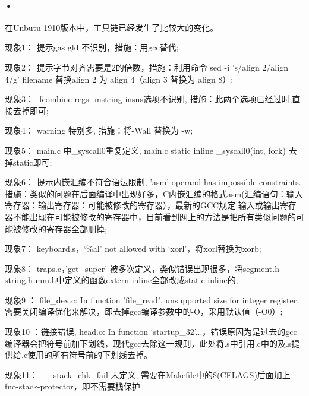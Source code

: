 \documentclass[12pt]{article}
\begin{document}
\paragraph{•}
在Unbutu 1910版本中，工具链已经发生了比较大的变化。
\begin{list}{•}{•}
\item 现象1： 提示gas gld 不识别，措施：用gcc替代;
\item 现象2： 提示字节对齐需要是2的倍数，措施：利用命令
sed -i 's/align 2/align 4/g' filename
替换align 2 为 align 4（align 3 替换为 align 8）;
\item 现象3： -fcombine-regs -mstring-insns选项不识别, 措施：此两个选项已经过时,直接去掉即可;
\item 现象4： warning 特别多, 措施：将-Wall 替换为 -w;
\item 现象5： main.c 中\_syscall0重复定义, main.c static inline \_syscall0(int, fork) 去掉static即可;
\item 现象6： 提示内嵌汇编不符合语法限制, 'asm' operand has impossible constraints. 措施：类似的问题在后面编译中出现好多，C内嵌汇编的格式asm(汇编语句：输入寄存器：输出寄存器：可能被修改的寄存器），最新的GCC规定 输入或输出寄存器不能出现在可能被修改的寄存器中，目前看到网上的方法是把所有类似问题的可能被修改的寄存器全部删掉;
\item 现象7： keyboard.s，`\%al' not allowed with `xorl'，将xorl替换为xorb;
\item 现象8： traps.c，'get\_super' 被多次定义，类似错误出现很多，将segment.h string.h mm.h中定义的函数extern inline全部改成static inline的;
\item 现象9 ： file\_dev.c: In function 'file\_read', unsupported size for integer register, 需要关闭编译优化来解决，即去掉gcc编译参数中的-O，采用默认值（-O0）;
\item 现象10 ：链接错误, head.o: In function `startup\_32'...，错误原因为是过去的gcc编译器会把符号前加下划线，现代gcc去除这一规则，此处将.s中引用.c中的及.s提供给.c使用的所有符号前的下划线去掉。
\item 现象11： \_\_stack\_chk\_fail 未定义, 需要在Makefile中的\$(CFLAGS)后面加上-fno-stack-protector，即不需要栈保护

\end{list}
\end{document}
